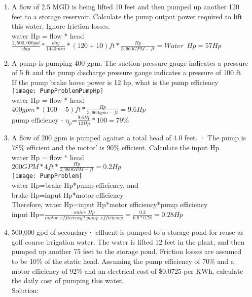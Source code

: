 \begin{enumerate}
\item A flow of 2.5 MGD is being lifted 10 feet and then pumped up another 120 feet to a storage reservoir. Calculate the pump output power required to lift this water. Ignore friction losses.\\
\vspace{0.4cm}
water Hp = flow * head\\
$\frac{2,500,000gal}{day}*\frac{day}{1440min}*(120+10)ft*\frac{Hp}{3,960 GPM-ft}=\boxed{Water \enspace Hp = 57Hp}$\\
\pagebreak


\item A pump is pumping 400 gpm.  The suction pressure gauge indicates a pressure of 5 ft and the pump discharge pressure gauge indicates a pressure of 100 ft.  If the pump brake horse power is 12 hp, what is the pump efficiency\\
\vspace{0.4cm}
\texttt{[image: PumpProblemPumpHp]}\\
water Hp = flow * head\\
$400gpm*(100-5)ft*\frac{Hp}{3,960 gpm-ft}=\boxed{9.6Hp}$\\
\vspace{0.4cm}
pump efficiency - $\eta_p$=$\frac{9.6Hp}{12Hp}*100=\boxed{79\%}$
\vspace{0.4cm}

\item A flow of 200 gpm  is pumped against a total head of 4.0 feet. · The pump is 78\% efficient and the motor' is 90\% efficient. Calculate the input Hp.\\
\vspace{0.4cm}
water Hp = flow * head\\
$200GPM*4ft*\frac{Hp}{3,960 GPM-ft}=0.2Hp$\\
\vspace{0.4cm}\texttt{[image: PumpProblem]}\\
water Hp=brake Hp*pump efficiency, and\\
brake Hp=input Hp*motor efficiency\\
Therefore, water Hp=input Hp*motor efficiency*pump efficiency\\
\vspace{0.4cm}
input Hp=$\frac{water \enspace Hp}{motor \enspace efficiency*pump \enspace efficiency}=\frac{0.2}{0.9*0.78}=\boxed{0.28Hp}$

\pagebreak

\item 500,000 gpd of secondary· effluent is pumped to  a  storage  pond  for  reuse  as golf course irrigation water.  The water is lifted 12 feet in the plant, and then pumped up another 75 feet to the storage pond. Friction losses are assumed to be 10\% of the static head.  Assuming the pump efficiency of 70\% and a motor efficiency of 92\% and an electrical cost of \$0.0725 per KWh, calculate the daily cost of pumping this water.\\
\vspace{0.4cm}
Solution:\\


\end{enumerate}

